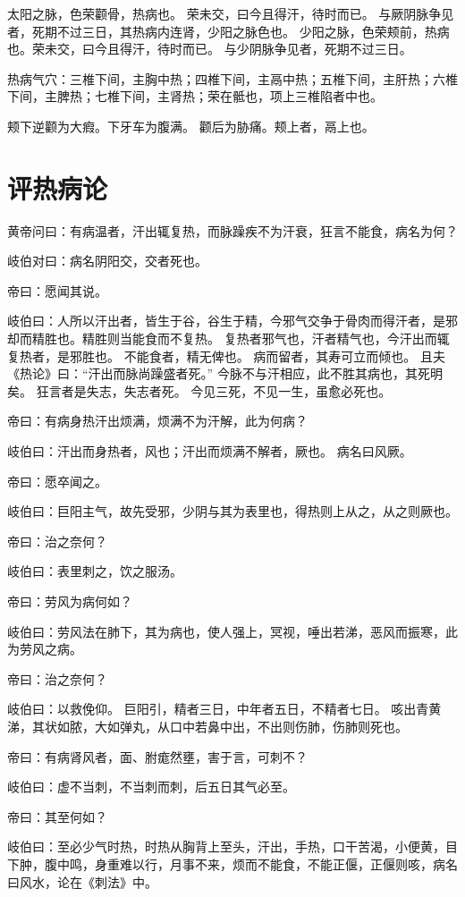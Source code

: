 \documentclass{article}%
\begin{document}
太阳之脉，色荣颧骨，热病也。
荣未交，曰今且得汗，待时而已。
与厥阴脉争见者，死期不过三日，其热病内连肾，少阳之脉色也。
少阳之脉，色荣颊前，热病也。荣未交，曰今且得汗，待时而已。
与少阴脉争见者，死期不过三日。

热病气穴：三椎下间，主胸中热；四椎下间，主鬲中热；五椎下间，主肝热；六椎下间，主脾热；七椎下间，主肾热；荣在骶也，项上三椎陷者中也。

颊下逆颧为大瘕。下牙车为腹满。
颧后为胁痛。颊上者，鬲上也。


\section{评热病论}
黄帝问曰：有病温者，汗出辄复热，而脉躁疾不为汗衰，狂言不能食，病名为何？

岐伯对曰：病名阴阳交，交者死也。

帝曰：愿闻其说。

岐伯曰：人所以汗出者，皆生于谷，谷生于精，今邪气交争于骨肉而得汗者，是邪却而精胜也。精胜则当能食而不复热。
复热者邪气也，汗者精气也，今汗出而辄复热者，是邪胜也。
不能食者，精无俾也。
病而留者，其寿可立而倾也。
且夫《热论》曰：“汗出而脉尚躁盛者死。”
今脉不与汗相应，此不胜其病也，其死明矣。
狂言者是失志，失志者死。
今见三死，不见一生，虽愈必死也。

帝曰：有病身热汗出烦满，烦满不为汗解，此为何病？

岐伯曰：汗出而身热者，风也；汗出而烦满不解者，厥也。
病名曰风厥。

帝曰：愿卒闻之。

岐伯曰：巨阳主气，故先受邪，少阴与其为表里也，得热则上从之，从之则厥也。

帝曰：治之奈何？

岐伯曰：表里刺之，饮之服汤。

帝曰：劳风为病何如？

岐伯曰：劳风法在肺下，其为病也，使人强上，冥视，唾出若涕，恶风而振寒，此为劳风之病。

帝曰：治之奈何？

岐伯曰：以救俛仰。
巨阳引，精者三日，中年者五日，不精者七日。
咳出青黄涕，其状如脓，大如弹丸，从口中若鼻中出，不出则伤肺，伤肺则死也。

帝曰：有病肾风者，面、胕痝然壅，害于言，可刺不？

岐伯曰：虚不当刺，不当刺而刺，后五日其气必至。

帝曰：其至何如？

岐伯曰：至必少气时热，时热从胸背上至头，汗出，手热，口干苦渴，小便黄，目下肿，腹中鸣，身重难以行，月事不来，烦而不能食，不能正偃，正偃则咳，病名曰风水，论在《刺法》中。
\end{document}
